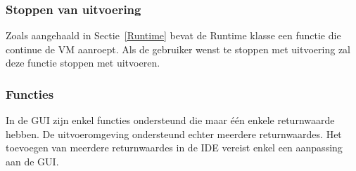 \documentclass[]{article}
\begin{document}
\subsubsection{Stoppen van uitvoering}
Zoals aangehaald in Sectie~\ref{Runtime} bevat de Runtime klasse een functie die continue de VM aanroept. Als de gebruiker wenst te stoppen met uitvoering zal deze functie stoppen met uitvoeren.

\subsubsection{Functies}
\label{returnwaardes}
In de GUI zijn enkel functies ondersteund die maar \'{e}\'{e}n enkele returnwaarde hebben. De uitvoeromgeving ondersteund echter meerdere returnwaardes. Het toevoegen van meerdere returnwaardes in de IDE vereist enkel een aanpassing aan de GUI.
\end{document}
